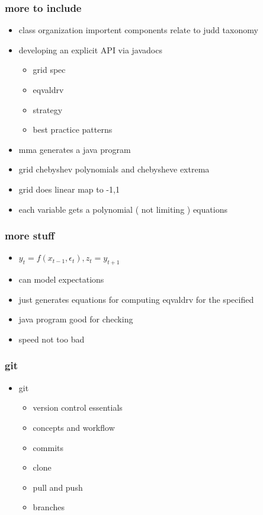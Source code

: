 \documentclass[tikz]{beamer}
\begin{document}
\begin{frame}
  \frametitle{more to include}
  \begin{itemize}
  \item class organization importent components relate to judd taxonomy
  \item developing an explicit API via javadocs
    \begin{itemize}
    \item grid spec
    \item eqvaldrv
    \item strategy
    \item best practice patterns
    \end{itemize}
  \item mma generates a java program
  \item grid chebyshev polynomials and chebysheve extrema
  \item grid does linear map to -1,1
  \item each variable gets a polynomial  ( not limiting )
equations
  \end{itemize}
\end{frame}
\begin{frame}
  \frametitle{more stuff}
  \begin{itemize}
\item $y_{t}=f(x_{t-1},\epsilon_t),z_t=y_{t+1}$
  \item can model expectations
  \item just generates equations for computing eqvaldrv for the specified
  \item java program good for checking
  \item speed not too bad
  \end{itemize}
\end{frame}



\begin{frame}
  \frametitle{git}
  \begin{itemize}
  \item git
    \begin{itemize}
    \item version control essentials
    \item concepts and workflow
    \item commits
    \item clone
    \item pull and push
    \item branches
    \end{itemize}
  \end{itemize}
\end{frame}
\end{document}
